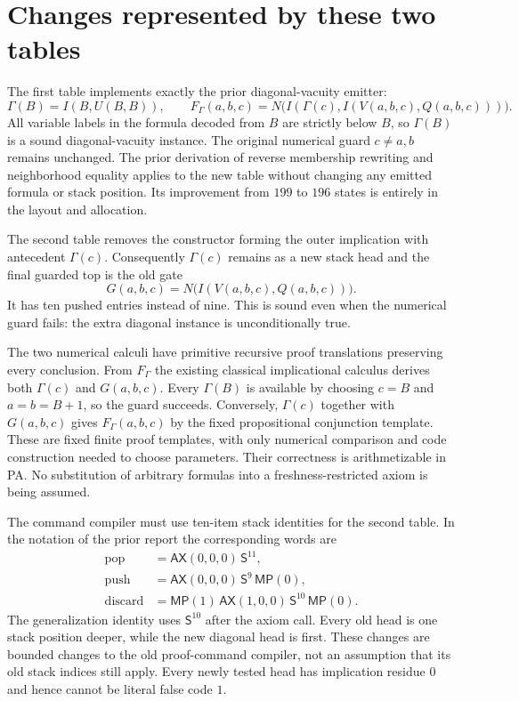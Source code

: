 \section{Changes represented by these two tables}
The first table implements exactly the prior diagonal-vacuity emitter:
\[
 \Gamma(B)=I(B,U(B,B)),\qquad
 F_\Gamma(a,b,c)=N\bigl(I(\Gamma(c),I(V(a,b,c),Q(a,b,c)))\bigr).
\]
All variable labels in the formula decoded from $B$ are strictly below $B$,
so $\Gamma(B)$ is a sound diagonal-vacuity instance. The original numerical
guard $c\ne a,b$ remains unchanged. The prior derivation of reverse
membership rewriting and neighborhood equality applies to the new table
without changing any emitted formula or stack position. Its improvement
from $199$ to $196$ states is entirely in the layout and allocation.

The second table removes the constructor forming the outer implication
with antecedent $\Gamma(c)$. Consequently $\Gamma(c)$ remains as a new
stack head and the final guarded top is the old gate
\[
 G(a,b,c)=N\bigl(I(V(a,b,c),Q(a,b,c))\bigr).
\]
It has ten pushed entries instead of nine. This is sound even when the
numerical guard fails: the extra diagonal instance is unconditionally true.

The two numerical calculi have primitive recursive proof translations
preserving every conclusion. From $F_\Gamma$ the existing classical
implicational calculus derives both $\Gamma(c)$ and $G(a,b,c)$. Every
$\Gamma(B)$ is available by choosing $c=B$ and $a=b=B+1$, so the guard
succeeds. Conversely, $\Gamma(c)$ together with $G(a,b,c)$ gives
$F_\Gamma(a,b,c)$ by the fixed propositional conjunction template. These
are fixed finite proof templates, with only numerical comparison and code
construction needed to choose parameters. Their correctness is
arithmetizable in PA. No substitution of arbitrary formulas into a
freshness-restricted axiom is being assumed.

The command compiler must use ten-item stack identities for the second
table. In the notation of the prior report the corresponding words are
\[
\begin{aligned}
 \mathrm{pop}&=\mathsf{AX}(0,0,0)\,\mathsf S^{11},\\
 \mathrm{push}&=\mathsf{AX}(0,0,0)\,\mathsf S^{9}\,\mathsf{MP}(0),\\
 \mathrm{discard}&=\mathsf{MP}(1)\,\mathsf{AX}(1,0,0)\,
                   \mathsf S^{10}\,\mathsf{MP}(0).
\end{aligned}
\]
The generalization identity uses $\mathsf S^{10}$ after the axiom call.
Every old head is one stack position deeper, while the new diagonal head
is first. These changes are bounded changes to the old proof-command
compiler, not an assumption that its old stack indices still apply.
Every newly tested head has implication residue $0$ and hence cannot be
literal false code $1$.

